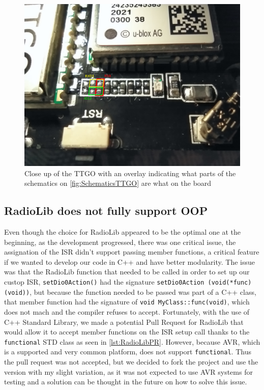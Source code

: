 \begin{figure}[h!]
        \centering
        \includegraphics[width=15cm]{Figures/DebuggerSolution.jpeg}
        \caption[TTGO closeup with overlay]{Close up of the TTGO with an overlay indicating what parts of the schematics on \autoref{fig:SchematicsTTGO} are what on the board}
        \label{fig:DebuggerSolutiion}
\end{figure}

\subsection{RadioLib does not fully support OOP}
Even though the choice for RadioLib appeared to be the optimal one at the beginning, as the development progressed, there was one critical issue, the assignation of the ISR didn't support passing member functions, a critical feature if we wanted to develop our code in C++ and have better modularity. The issue was that the RadioLib function that needed to be called in order to set up our custop ISR, \texttt{setDio0Action()} had the signature \texttt{setDio0Action (void(*func)(void))}, but because the function needed to be passed was part of a C++ class, that member function had the signature of \texttt{void MyClass::func(void)}, which does not mach and the compiler refuses to accept. Fortunately, with the use of C++ Standard Library, we made a potential Pull Request for RadioLib that would allow it to accept member functions on the ISR setup call thanks to the \texttt{functional} STD class as seen in \autoref{lst:RadioLibPR}. However, because AVR, which is a supported and very common platform, does not support \texttt{functional}\cite{RadioLibPR}. Thus the pull request was not accepted, but we decided to fork the project and use the version with my slight variation, as it was not expected to use AVR systems for testing and a solution can be thought in the future on how to solve this issue.

